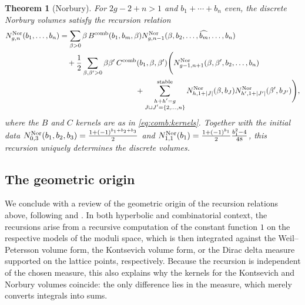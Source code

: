 \documentclass[a4paper,11pt,english]{article}
\theoremstyle{plain}
\newtheorem{theorem}{Theorem}[section]
\theoremstyle{definition}
\theoremstyle{plain}
\begin{document}
\begin{theorem}[Norbury]\label{thm:Nor}
    For $2g-2+n > 1$ and $b_1 + \cdots + b_n$ even, the discrete Norbury volumes satisfy the recursion relation
	\begin{equation}
    \begin{split}
    	N^{\textup{Nor}}_{g,n}(b_1,\ldots,b_n)
    	&=
    	\sum_{\beta > 0}
    		  \beta \, B^{\textup{comb}}(b_1,b_m,\beta)
    		  N^{\textup{Nor}}_{g,n-1}(\beta,b_2,\dots, \widehat{b_m},\dots, b_n) \\
    	& \quad
    	+ \frac{1}{2} \sum_{\beta,\beta' > 0}
    		\beta \beta' \, C^{\textup{comb}}(b_1,\beta,\beta') \Bigg(
    			N^{\textup{Nor}}_{g-1,n+1}(\beta,\beta',b_2,\dots,b_n) \\
    	& \qquad\qquad\qquad\qquad\qquad
    			+
    			\sum_{\substack{ h + h' = g \\ J \sqcup J' = \{2,\dots,n\} }}^{\textup{stable}}
    				N^{\textup{Nor}}_{h,1+|J|}(\beta,b_{J})
    				N^{\textup{Nor}}_{h',1+|J'|}(\beta',b_{J'})
    	\Bigg),
    \end{split}
    \end{equation}
	where the $B$ and $C$ kernels are as in \cref{eq:comb:kernels}.
    Together with the initial data $N^{\textup{Nor}}_{0,3}(b_1,b_2,b_3) = \frac{1 + (-1)^{b_1+b_2+b_3}}{2}$ and $N^{\textup{Nor}}_{1,1}(b_1) = \frac{1 + (-1)^{b_1}}{2}\frac{b_1^2 - 4}{48}$, this recursion uniquely determines the discrete volumes.
\end{theorem}

\subsection{The geometric origin}
\label{sec:geomrorigins}
We conclude with a review of the geometric origin of the recursion relations above, following \cite{Mir07a} and \cite{ABCGLW}. In both hyperbolic and combinatorial context, the recursions arise from a recursive computation of the constant function $1$ on the respective models of the moduli space, which is then integrated against the Weil--Petersson volume form, the Kontsevich volume form, or the Dirac delta measure supported on the lattice points, respectively. Because the recursion is independent of the chosen measure, this also explains why the kernels for the Kontsevich and Norbury volumes coincide: the only difference lies in the measure, which merely converts integrals into sums.
\end{document}
